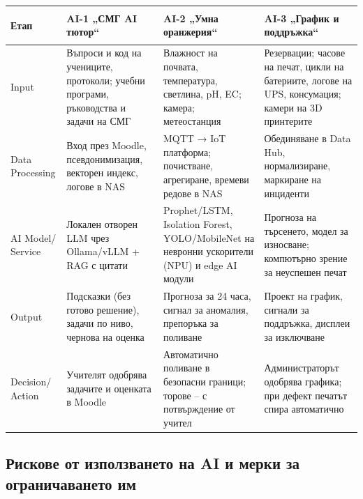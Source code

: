 \documentclass[11pt,a4paper]{article}
\renewcommand{\arraystretch}{1.15}
\begin{document}
\begingroup\footnotesize
\setlength{\tabcolsep}{4pt}
\renewcommand{\arraystretch}{1.1}
\noindent\begin{tabularx}{\textwidth}{@{}>{\bfseries\raggedright\arraybackslash}p{1.95cm}>{\raggedright\arraybackslash}X>{\raggedright\arraybackslash}X>{\raggedright\arraybackslash}X@{}}
\toprule
\rowcolor{sand}Етап & \textbf{AI-1 „СМГ AI тютор“} & \textbf{AI-2 „Умна оранжерия“} & \textbf{AI-3 „График и поддръжка“}\\
\midrule
Input & Въпроси и код на учениците, протоколи; учебни програми, ръководства и задачи на СМГ & Влажност на почвата, температура, светлина, pH, EC; камера; метеостанция & Резервации; часове на печат, цикли на батериите, логове на UPS, консумация; камери на 3D принтерите\\
Data Processing & Вход през Moodle, псевдонимизация, векторен индекс, логове в NAS & MQTT → IoT платформа; почистване, агрегиране, времеви редове в NAS & Обединяване в Data Hub, нормализиране, маркиране на инциденти\\
AI Model/ Service & Локален отворен LLM чрез Ollama/vLLM + RAG с цитати & Prophet/LSTM, Isolation Forest, YOLO/MobileNet на невронни ускорители (NPU) и edge AI модули & Прогноза на търсенето, модел за износване; компютърно зрение за неуспешен печат\\
Output & Подсказки (без готово решение), задачи по ниво, чернова на оценка & Прогноза за 24 часа, сигнал за аномалия, препоръка за поливане & Проект на график, сигнали за поддръжка, дисплеи за изключване\\
Decision/ Action & Учителят одобрява задачите и оценката в Moodle & Автоматично поливане в безопасни граници; торове – с потвърждение от учител & Администраторът одобрява графика; при дефект печатът спира автоматично\\
\bottomrule
\end{tabularx}
\endgroup

\subsection{Рискове от използването на AI и мерки за ограничаването им}
\end{document}
